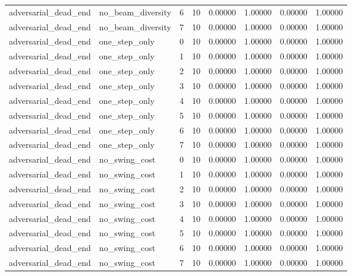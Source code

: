 \documentclass{article}
\begin{document}
\begin{table}[tbp]
{\begin{tabular}{llllllll}
adversarial\_dead\_end & no\_beam\_diversity & 6 & 10 & 0.00000 & 1.00000 & 0.00000 & 1.00000 \\
adversarial\_dead\_end & no\_beam\_diversity & 7 & 10 & 0.00000 & 1.00000 & 0.00000 & 1.00000 \\
adversarial\_dead\_end & one\_step\_only & 0 & 10 & 0.00000 & 1.00000 & 0.00000 & 1.00000 \\
adversarial\_dead\_end & one\_step\_only & 1 & 10 & 0.00000 & 1.00000 & 0.00000 & 1.00000 \\
adversarial\_dead\_end & one\_step\_only & 2 & 10 & 0.00000 & 1.00000 & 0.00000 & 1.00000 \\
adversarial\_dead\_end & one\_step\_only & 3 & 10 & 0.00000 & 1.00000 & 0.00000 & 1.00000 \\
adversarial\_dead\_end & one\_step\_only & 4 & 10 & 0.00000 & 1.00000 & 0.00000 & 1.00000 \\
adversarial\_dead\_end & one\_step\_only & 5 & 10 & 0.00000 & 1.00000 & 0.00000 & 1.00000 \\
adversarial\_dead\_end & one\_step\_only & 6 & 10 & 0.00000 & 1.00000 & 0.00000 & 1.00000 \\
adversarial\_dead\_end & one\_step\_only & 7 & 10 & 0.00000 & 1.00000 & 0.00000 & 1.00000 \\
adversarial\_dead\_end & no\_swing\_cost & 0 & 10 & 0.00000 & 1.00000 & 0.00000 & 1.00000 \\
adversarial\_dead\_end & no\_swing\_cost & 1 & 10 & 0.00000 & 1.00000 & 0.00000 & 1.00000 \\
adversarial\_dead\_end & no\_swing\_cost & 2 & 10 & 0.00000 & 1.00000 & 0.00000 & 1.00000 \\
adversarial\_dead\_end & no\_swing\_cost & 3 & 10 & 0.00000 & 1.00000 & 0.00000 & 1.00000 \\
adversarial\_dead\_end & no\_swing\_cost & 4 & 10 & 0.00000 & 1.00000 & 0.00000 & 1.00000 \\
adversarial\_dead\_end & no\_swing\_cost & 5 & 10 & 0.00000 & 1.00000 & 0.00000 & 1.00000 \\
adversarial\_dead\_end & no\_swing\_cost & 6 & 10 & 0.00000 & 1.00000 & 0.00000 & 1.00000 \\
adversarial\_dead\_end & no\_swing\_cost & 7 & 10 & 0.00000 & 1.00000 & 0.00000 & 1.00000 \\
\bottomrule
\end{tabular}
}
\end{table}

\clearpage
\end{document}
